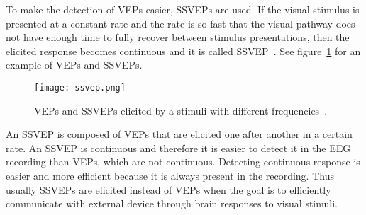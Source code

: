 To make the detection of \glspl{VEP} easier, \glspl{SSVEP} are used. If the visual stimulus is presented at a constant rate and the rate is so fast that the visual pathway does not have enough time to fully recover between stimulus presentations, then the elicited response becomes continuous and it is called \gls{SSVEP}~\cite{VEP}. See figure~\ref{fig:ssvep} for an example of \glspl{VEP} and \glspl{SSVEP}.

\begin{figure}[h!]
	\centering
	\texttt{[image: ssvep.png]}
	\caption{VEPs and SSVEPs elicited by a stimuli with different frequencies~\cite[p.~259]{VEP}.}
	\label{fig:ssvep}
\end{figure}

An \gls{SSVEP} is composed of \glspl{VEP} that are elicited one after another in a certain rate. An \gls{SSVEP} is continuous and therefore it is easier to detect it in the \gls{EEG} recording than \glspl{VEP}, which are not continuous. Detecting continuous response is easier and more efficient because it is always present in the recording. Thus usually \glspl{SSVEP} are elicited instead of \glspl{VEP} when the goal is to efficiently communicate with external device through brain responses to visual stimuli. %





